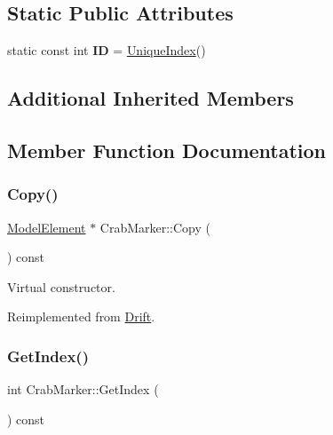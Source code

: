 \subsection*{Static Public Attributes}
\begin{DoxyCompactItemize}
\item 
\mbox{\label{classCrabMarker_a117b834252f16859870333f898179929}} 
static const int {\bfseries ID} = \hyperlink{classAcceleratorComponent_aa7ad4d39e1a488b705983842ed1ac784}{Unique\+Index}()
\end{DoxyCompactItemize}
\subsection*{Additional Inherited Members}


\subsection{Member Function Documentation}
\mbox{\label{classCrabMarker_acd6d5d5a310e985f191443b42d8abc72}} 
\subsubsection{\texorpdfstring{Copy()}{Copy()}}
{\footnotesize\ttfamily \hyperlink{classModelElement}{Model\+Element} $\ast$ Crab\+Marker\+::\+Copy (\begin{DoxyParamCaption}{ }\end{DoxyParamCaption}) const\hspace{0.3cm}{\ttfamily [virtual]}}

Virtual constructor. 

Reimplemented from \hyperlink{classDrift_ae47df31297596e13944364d602c95ce5}{Drift}.

\mbox{\label{classCrabMarker_ae8678c41613db9792f84faf3feb88f2b}} 
\subsubsection{\texorpdfstring{Get\+Index()}{GetIndex()}}
{\footnotesize\ttfamily int Crab\+Marker\+::\+Get\+Index (\begin{DoxyParamCaption}{ }\end{DoxyParamCaption}) const\hspace{0.3cm}{\ttfamily [virtual]}}


